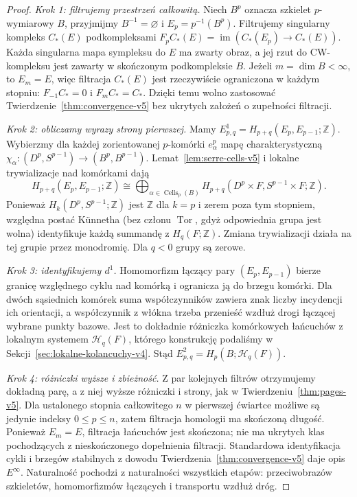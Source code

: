 \documentclass[11pt,a4paper,oneside]{report}
\newcommand{\Z}{\mathbb{Z}}
\theoremstyle{plain}
\theoremstyle{definition}
\theoremstyle{remark}
\begin{document}
\begin{proof}
\emph{Krok 1: filtrujemy przestrzeń całkowitą.}
Niech $B^p$ oznacza szkielet $p$-wymiarowy $B$, przyjmijmy
$B^{-1}=\varnothing$ i $E_p=p^{-1}(B^p)$.
Filtrujemy singularny kompleks $C_*(E)$ podkompleksami
$F_pC_*(E)=\operatorname{im}(C_*(E_p)\to C_*(E))$.
Każda singularna mapa sympleksu do $E$ ma zwarty obraz,
a jej rzut do CW-kompleksu jest zawarty w skończonym
podkompleksie $B$. Jeżeli $m=\dim B<\infty$, to
$E_m=E$, więc filtracja $C_*(E)$ jest rzeczywiście
ograniczona w każdym stopniu: $F_{-1}C_*=0$ i
$F_mC_*=C_*$. Dzięki temu wolno zastosować
Twierdzenie~\ref{thm:convergence-v5} bez ukrytych
założeń o zupełności filtracji.

\emph{Krok 2: obliczamy wyrazy strony pierwszej.}
Mamy $E^1_{p,q}=H_{p+q}(E_p,E_{p-1};\Z)$.
Wybierzmy dla każdej zorientowanej $p$-komórki $e^p_\alpha$
mapę charakterystyczną
$\chi_\alpha:(D^p,S^{p-1})\to(B^p,B^{p-1})$.
Lemat~\ref{lem:serre-cells-v5} i lokalne trywializacje nad komórkami dają
\[
H_{p+q}(E_p,E_{p-1};\Z)\cong
\bigoplus_{\alpha\in\operatorname{Cells}_p(B)}
H_{p+q}(D^p\times F,S^{p-1}\times F;\Z).
\]
Ponieważ $H_k(D^p,S^{p-1};\Z)$ jest $\Z$ dla $k=p$
i zerem poza tym stopniem, względna postać
Künnetha (bez członu $\operatorname{Tor}$, gdyż odpowiednia
grupa jest wolna) identyfikuje każdą summandę z
$H_q(F;\Z)$. Zmiana trywializacji działa na tej grupie
przez monodromię. Dla $q<0$ grupy są zerowe.

\emph{Krok 3: identyfikujemy $d^1$.}
Homomorfizm łączący pary $(E_p,E_{p-1})$ bierze granicę
względnego cyklu nad komórką i ogranicza ją do brzegu komórki.
Dla dwóch sąsiednich komórek suma współczynników
zawiera znak liczby incydencji ich orientacji, a
współczynnik z włókna trzeba przenieść wzdłuż drogi
łączącej wybrane punkty bazowe. Jest to dokładnie
różniczka komórkowych łańcuchów z lokalnym systemem
$\mathcal H_q(F)$, którego konstrukcję podaliśmy w
Sekcji~\ref{sec:lokalne-kolancuchy-v4}.
Stąd $E^2_{p,q}=H_p(B;\mathcal H_q(F))$.

\emph{Krok 4: różniczki wyższe i zbieżność.}
Z par kolejnych filtrów otrzymujemy dokładną parę,
a z niej wyższe różniczki i strony, jak w
Twierdzeniu~\ref{thm:pages-v5}.
Dla ustalonego stopnia całkowitego $n$ w pierwszej ćwiartce
możliwe są jedynie indeksy $0\le p\le n$,
zatem filtracja homologii ma skończoną długość.
Ponieważ $E_m=E$, filtracja łańcuchów jest skończona;
nie ma ukrytych klas pochodzących z nieskończonego
dopełnienia filtracji. Standardowa
identyfikacja cykli i brzegów stabilnych z dowodu
Twierdzenia~\ref{thm:convergence-v5} daje opis $E^\infty$.
Naturalność pochodzi z naturalności wszystkich etapów:
przeciwobrazów szkieletów, homomorfizmów łączących i
transportu wzdłuż dróg.
\end{proof}
\end{document}
